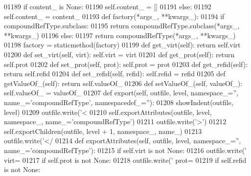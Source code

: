 \begin{DoxyCode}
{{{{{{{{{{{{{{{{{{{{{{{{{{{{{{{{{{{{{{{{{{{{{{{{{{{{{{{{{{{{{01189         \textcolor{keywordflow}{if} content\_ \textcolor{keywordflow}{is} \textcolor{keywordtype}{None}:
01190             self.content_ = []
01191         \textcolor{keywordflow}{else}:
01192             self.content_ = content\_
01193     \textcolor{keyword}{def }factory(*args\_, **kwargs\_):
01194         \textcolor{keywordflow}{if} compoundRefType.subclass:
01195             \textcolor{keywordflow}{return} compoundRefType.subclass(*args\_, **kwargs\_)
01196         \textcolor{keywordflow}{else}:
01197             \textcolor{keywordflow}{return} compoundRefType(*args\_, **kwargs\_)
01198     factory = staticmethod(factory)
01199     \textcolor{keyword}{def }get_virt(self): \textcolor{keywordflow}{return} self.virt
01200     \textcolor{keyword}{def }set_virt(self, virt): self.virt = virt
01201     \textcolor{keyword}{def }get_prot(self): \textcolor{keywordflow}{return} self.prot
01202     \textcolor{keyword}{def }set_prot(self, prot): self.prot = prot
01203     \textcolor{keyword}{def }get_refid(self): \textcolor{keywordflow}{return} self.refid
01204     \textcolor{keyword}{def }set_refid(self, refid): self.refid = refid
01205     \textcolor{keyword}{def }getValueOf_(self): \textcolor{keywordflow}{return} self.valueOf\_
01206     \textcolor{keyword}{def }setValueOf_(self, valueOf\_): self.valueOf\_ = valueOf\_
01207     \textcolor{keyword}{def }export(self, outfile, level, namespace\_='', name\_='compoundRefType', namespacedef\_=''):
01208         showIndent(outfile, level)
01209         outfile.write(\textcolor{stringliteral}{'<%
01210         self.exportAttributes(outfile, level, namespace\_, name\_=\textcolor{stringliteral}{'compoundRefType'})
01211         outfile.write(\textcolor{stringliteral}{'>'})
01212         self.exportChildren(outfile, level + 1, namespace\_, name\_)
01213         outfile.write(\textcolor{stringliteral}{'</%
01214     \textcolor{keyword}{def }exportAttributes(self, outfile, level, namespace\_='', name\_='compoundRefType'):
01215         \textcolor{keywordflow}{if} self.virt \textcolor{keywordflow}{is} \textcolor{keywordflow}{not} \textcolor{keywordtype}{None}:
01216             outfile.write(\textcolor{stringliteral}{' virt=%
01217         \textcolor{keywordflow}{if} self.prot \textcolor{keywordflow}{is} \textcolor{keywordflow}{not} \textcolor{keywordtype}{None}:
01218             outfile.write(\textcolor{stringliteral}{' prot=%
01219         \textcolor{keywordflow}{if} self.refid \textcolor{keywordflow}{is} \textcolor{keywordflow}{not} \textcolor{keywordtype}{None}:
}}}}}}}}}}}}}}}}}}}}}}}}}}}}}}}}}}}}}}}}}}}}}}}}}}}}}}}}}}}}}}}}}
\end{DoxyCode}
